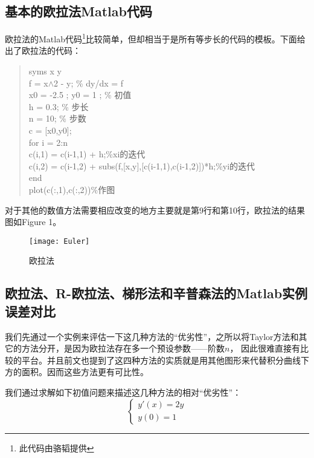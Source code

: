 \documentclass[a4paper,12pt]{article}
\begin{document}
\subsection{基本的欧拉法Matlab代码}
欧拉法的Matlab代码\footnote{此代码由骆韬提供}比较简单，但却相当于是所有等步长的代码的模板。下面给出了欧拉法的代码：
\begin{quote}
\small{
syms x y\\
f = x$\wedge$2 - y; \% dy/dx = f\\
x0 = -2.5 ; y0 = 1 ; \% 初值\\
h = 0.3; \% 步长\\
n = 10; \% 步数\\
c = [x0,y0];\\
for i = 2:n\\
    c(i,1) = c(i-1,1) + h;\%xi的迭代\\
    c(i,2) = c(i-1,2) + subs(f,[x,y],[c(i-1,1),c(i-1,2)])*h;\%yi的迭代\\
end\\
plot(c(:,1),c(:,2))\%作图
}
\end{quote}
对于其他的数值方法需要相应改变的地方主要就是第9行和第10行，欧拉法的结果图如Figure 1。
\begin{figure}
\centering
\texttt{[image: Euler]}
\caption{欧拉法}
\end{figure}



\subsection{欧拉法、R-欧拉法、梯形法和辛普森法的Matlab实例误差对比}
我们先通过一个实例来评估一下这几种方法的“优劣性”，之所以将Taylor方法和其它的方法分开，是因为欧拉法存在多一个预设参数——阶数$n$，
因此很难直接有比较的平台。并且前文也提到了这四种方法的实质就是用其他图形来代替积分曲线下方的面积。因而这些方法更有可比性。\par
我们通过求解如下初值问题来描述这几种方法的相对“优劣性”：
\begin{equation}
    \left\{
      \begin{array}{ll}
        y'(x)=2y \\
        y(0)=1
      \end{array}
    \right.
\end{equation}
\end{document}
